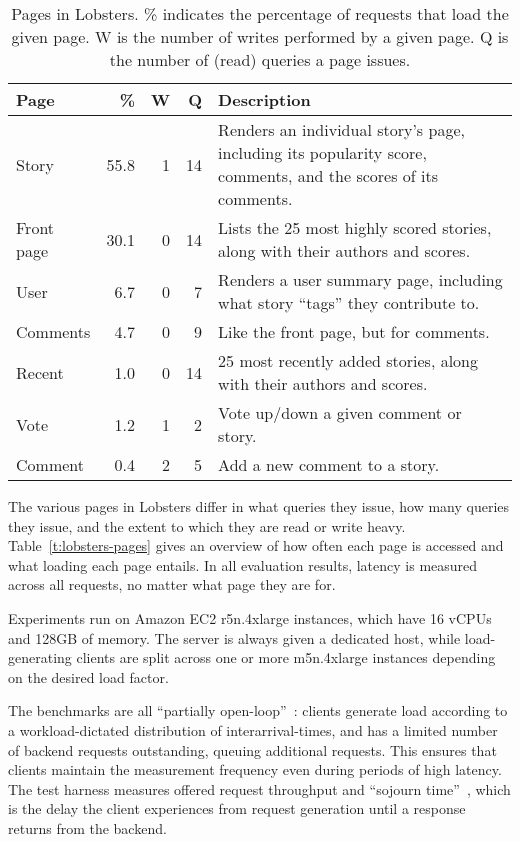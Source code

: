 \begin{table}
  \begin{tabular}{ p{0.8in} | r | r | r | p{2.9in} }
    Page & \% & W & Q & Description \\
    \hline
    Story & 55.8 & 1 & 14 & Renders an individual story's page, including its
    popularity score, comments, and the scores of its comments.\\
    Front page & 30.1 & 0 & 14 & Lists the 25 most highly scored stories, along
    with their authors and scores.\\
    User & 6.7 & 0 & 7 & Renders a user summary page, including what story
    ``tags'' they contribute to.\\
    Comments & 4.7 & 0 & 9 & Like the front page, but for comments.\\
    Recent & 1.0 & 0 & 14 & 25 most recently added stories, along with their
    authors and scores.\\
    Vote & 1.2 & 1 & 2 & Vote up/down a given comment or story.\\
    Comment & 0.4 & 2 & 5 & Add a new comment to a story.\\
  \end{tabular}
  \caption{Pages in Lobsters. \% indicates the percentage of requests that load
  the given page. W is the number of writes performed by a given page. Q is the
  number of (read) queries a page issues.}
  \label{t:lobsters-pages}
\end{table}

The various pages in Lobsters differ in what queries they issue, how many
queries they issue, and the extent to which they are read or write heavy.
Table~\vref{t:lobsters-pages} gives an overview of how often each page is
accessed and what loading each page entails. In all evaluation results, latency
is measured across all requests, no matter what page they are for.

Experiments run on Amazon EC2 r5n.4xlarge instances, which have 16 vCPUs and
128GB of memory. The server is always given a dedicated host, while
load-generating clients are split across one or more m5n.4xlarge instances
depending on the desired load factor.

The benchmarks are all ``partially open-loop''~\cite{frank-open-loop}:
clients generate load according to a workload-dictated distribution of
interarrival-times, and has a limited number of backend requests outstanding,
queuing additional requests. This ensures that clients maintain the measurement
frequency even during periods of high latency. The test harness measures offered
request throughput and ``sojourn time''~\cite{open-loop-cautionary-tale}, which
is the delay the client experiences from request generation until a response
returns from the backend.

